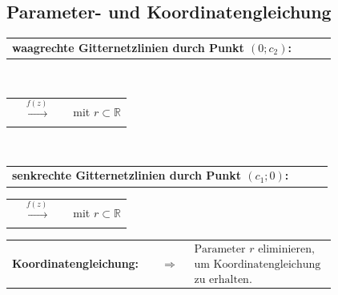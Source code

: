 \subsection{Parameter- und Koordinatengleichung}
	\begin{minipage}[]{0.2\textwidth}
		\scalebox{0.5}{}
	\end{minipage}
	\begin{minipage}[]{0.8\textwidth}
		\begin{tabular}{llll}
			\textbf{waagrechte Gitternetzlinien durch Punkt $(0; c_2)$:} & & &
		\end{tabular}\\[3pt]
		\begin{tabular}{llll}
			\fbox{$z = \operatorname{z}\left( r \right) = r + \mathrm{j} c_2$} & $\xrightarrow[]{f\left( z \right)}$ & \fbox{$w = \operatorname{w}\left( r \right) = f\left( \operatorname{z}\left( r \right) \right) = f\left( r + \mathrm{j} c_2 \right)$} & mit $r \subset \mathbb{R}$\\[3pt]
		\end{tabular}\\[3pt]
		\begin{tabular}{llll}
			\textbf{senkrechte Gitternetzlinien durch Punkt $(c_1; 0)$:} & & &
		\end{tabular}
		\begin{tabular}{llll}
			\fbox{$z = \operatorname{z}\left( r \right) = c_1 + \mathrm{j} r$} & $\xrightarrow[]{f\left( z \right)}$ & \fbox{$w = \operatorname{w}\left( r \right) = f\left( \operatorname{z}\left( r \right) \right) = f\left( c_1 + \mathrm{j} r \right)$} & mit $r \subset \mathbb{R}$\\[3pt]
		\end{tabular}
		\begin{tabular}{llll}
			\textbf{Koordinatengleichung:} & 
			\fbox{$\left| \begin{array}{c}
				w_1 = \operatorname{Re}\left(\left[ f\left(\operatorname{z}\left(r \right)\right)\right]\right)\\[3pt]
				w_2 = \operatorname{Re}\left(\left[ f\left(\operatorname{z}\left(r \right)\right)\right]\right)
				\end{array} \right|$} &
			$\Rightarrow$ & 
			$\begin{array}{l}
				\text{Parameter $r$ eliminieren,}\\[3pt]
				\text{um Koordinatengleichung}\\[3pt]
				\text{zu erhalten.}
			\end{array}$
		\end{tabular}
	\end{minipage}

